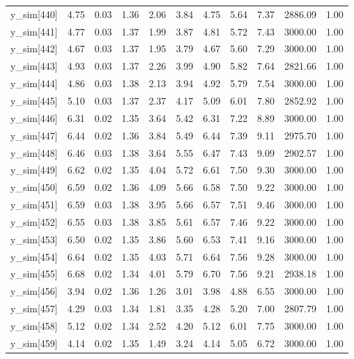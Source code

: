 \begin{table}[ht]
\begin{tabular}{rrrrrrrrrrr}
  y\_sim[440] & 4.75 & 0.03 & 1.36 & 2.06 & 3.84 & 4.75 & 5.64 & 7.37 & 2886.09 & 1.00 \\ 
  y\_sim[441] & 4.77 & 0.03 & 1.37 & 1.99 & 3.87 & 4.81 & 5.72 & 7.43 & 3000.00 & 1.00 \\ 
  y\_sim[442] & 4.67 & 0.03 & 1.37 & 1.95 & 3.79 & 4.67 & 5.60 & 7.29 & 3000.00 & 1.00 \\ 
  y\_sim[443] & 4.93 & 0.03 & 1.37 & 2.26 & 3.99 & 4.90 & 5.82 & 7.64 & 2821.66 & 1.00 \\ 
  y\_sim[444] & 4.86 & 0.03 & 1.38 & 2.13 & 3.94 & 4.92 & 5.79 & 7.54 & 3000.00 & 1.00 \\ 
  y\_sim[445] & 5.10 & 0.03 & 1.37 & 2.37 & 4.17 & 5.09 & 6.01 & 7.80 & 2852.92 & 1.00 \\ 
  y\_sim[446] & 6.31 & 0.02 & 1.35 & 3.64 & 5.42 & 6.31 & 7.22 & 8.89 & 3000.00 & 1.00 \\ 
  y\_sim[447] & 6.44 & 0.02 & 1.36 & 3.84 & 5.49 & 6.44 & 7.39 & 9.11 & 2975.70 & 1.00 \\ 
  y\_sim[448] & 6.46 & 0.03 & 1.38 & 3.64 & 5.55 & 6.47 & 7.43 & 9.09 & 2902.57 & 1.00 \\ 
  y\_sim[449] & 6.62 & 0.02 & 1.35 & 4.04 & 5.72 & 6.61 & 7.50 & 9.30 & 3000.00 & 1.00 \\ 
  y\_sim[450] & 6.59 & 0.02 & 1.36 & 4.09 & 5.66 & 6.58 & 7.50 & 9.22 & 3000.00 & 1.00 \\ 
  y\_sim[451] & 6.59 & 0.03 & 1.38 & 3.95 & 5.66 & 6.57 & 7.51 & 9.46 & 3000.00 & 1.00 \\ 
  y\_sim[452] & 6.55 & 0.03 & 1.38 & 3.85 & 5.61 & 6.57 & 7.46 & 9.22 & 3000.00 & 1.00 \\ 
  y\_sim[453] & 6.50 & 0.02 & 1.35 & 3.86 & 5.60 & 6.53 & 7.41 & 9.16 & 3000.00 & 1.00 \\ 
  y\_sim[454] & 6.64 & 0.02 & 1.35 & 4.03 & 5.71 & 6.64 & 7.56 & 9.28 & 3000.00 & 1.00 \\ 
  y\_sim[455] & 6.68 & 0.02 & 1.34 & 4.01 & 5.79 & 6.70 & 7.56 & 9.21 & 2938.18 & 1.00 \\ 
  y\_sim[456] & 3.94 & 0.02 & 1.36 & 1.26 & 3.01 & 3.98 & 4.88 & 6.55 & 3000.00 & 1.00 \\ 
  y\_sim[457] & 4.29 & 0.03 & 1.34 & 1.81 & 3.35 & 4.28 & 5.20 & 7.00 & 2807.79 & 1.00 \\ 
  y\_sim[458] & 5.12 & 0.02 & 1.34 & 2.52 & 4.20 & 5.12 & 6.01 & 7.75 & 3000.00 & 1.00 \\ 
  y\_sim[459] & 4.14 & 0.02 & 1.35 & 1.49 & 3.24 & 4.14 & 5.05 & 6.72 & 3000.00 & 1.00 \\ 

\end{tabular}
\end{table}
